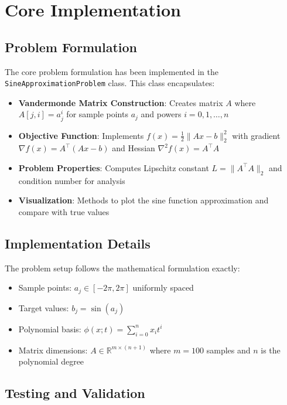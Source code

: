 \documentclass[11pt,a4paper]{article}
\begin{document}
\section{Core Implementation}

\subsection{Problem Formulation}

The core problem formulation has been implemented in the \texttt{SineApproximationProblem} class. This class encapsulates:

\begin{itemize}
    \item \textbf{Vandermonde Matrix Construction}: Creates matrix $A$ where $A[j,i] = a_j^i$ for sample points $a_j$ and powers $i = 0, 1, \ldots, n$
    \item \textbf{Objective Function}: Implements $f(x) = \frac{1}{2}\|Ax - b\|_2^2$ with gradient $\nabla f(x) = A^\top(Ax - b)$ and Hessian $\nabla^2 f(x) = A^\top A$
    \item \textbf{Problem Properties}: Computes Lipschitz constant $L = \|A^\top A\|_2$ and condition number for analysis
    \item \textbf{Visualization}: Methods to plot the sine function approximation and compare with true values
\end{itemize}

\subsection{Implementation Details}

The problem setup follows the mathematical formulation exactly:
\begin{itemize}
    \item Sample points: $a_j \in [-2\pi, 2\pi]$ uniformly spaced
    \item Target values: $b_j = \sin(a_j)$
    \item Polynomial basis: $\phi(x;t) = \sum_{i=0}^n x_i t^i$
    \item Matrix dimensions: $A \in \mathbb{R}^{m \times (n+1)}$ where $m = 100$ samples and $n$ is the polynomial degree
\end{itemize}

\subsection{Testing and Validation}
\end{document}
